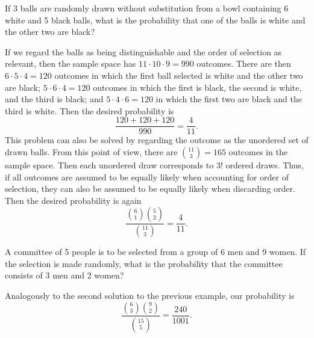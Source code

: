 \begin{changebar}
\begin{example}
    If 3 balls are randomly drawn without substitution from a bowl containing 6 white and 5 black balls, what is the probability that one of the balls is white and the other two are black?
\end{example}
\begin{solution}
    If we regard the balls as being distinguishable and the order of selection as relevant, then the sample space has $11\cdot 10 \cdot 9 = 990$ outcomes. There are then $6 \cdot 5 \cdot 4 = 120$ outcomes in which the first ball selected is white and the other two are black; $5 \cdot 6 \cdot 4 = 120$ outcomes in which the first is black, the second is white, and the third is black; and $5 \cdot 4 \cdot 6 = 120$ in which the first two are black and the third is white. Then the desired probability is \[
        \frac{120 + 120 + 120}{990} = \frac{4}{11}.    
    \]
    This problem can also be solved by regarding the outcome as the unordered set of drawn balls. From this point of view, there are ${11 \choose 3} = 165$ outcomes in the sample space. Then each unordered draw corresponds to $3!$ ordered draws. Thus, if all outcomes are assumed to be equally likely when accounting for order of selection, they can also be assumed to be equally likely when discarding order. Then the desired probability is again \[
        \frac{{6 \choose 1}{5 \choose 2}}{{11 \choose 3}} = \frac{4}{11}.    
    \]
\end{solution}
\end{changebar}

\begin{changebar}
\begin{example}
    A committee of 5 people is to be selected from a group of 6 men and 9 women. If the selection is made randomly, what is the probability that the committee consists of 3 men and 2 women?
\end{example}
\begin{solution}
    Analogously to the second solution to the previous example, our probability is \[
        \dfrac{{6 \choose 3}{9 \choose 2}}{{15 \choose 5}} = \frac{240}{1001}.
    \]
\end{solution}
\end{changebar}

